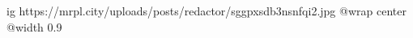  
 
 
 
 

\ifcmt
  ig https://mrpl.city/uploads/posts/redactor/sggpxsdb3nsnfqi2.jpg
  @wrap center
  @width 0.9
\fi
